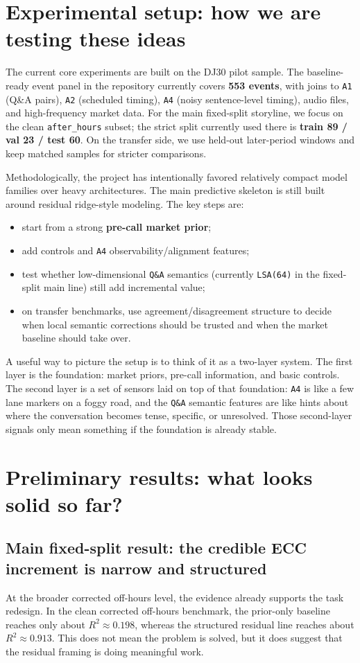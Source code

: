 \documentclass[11pt]{article}
\begin{document}
\section{Experimental setup: how we are testing these ideas}
The current core experiments are built on the DJ30 pilot sample. The baseline-ready event panel in the repository currently covers \textbf{553 events}, with joins to \texttt{A1} (Q\&A pairs), \texttt{A2} (scheduled timing), \texttt{A4} (noisy sentence-level timing), audio files, and high-frequency market data. For the main fixed-split storyline, we focus on the clean \texttt{after\_hours} subset; the strict split currently used there is \textbf{train 89 / val 23 / test 60}. On the transfer side, we use held-out later-period windows and keep matched samples for stricter comparisons.

Methodologically, the project has intentionally favored relatively compact model families over heavy architectures. The main predictive skeleton is still built around residual ridge-style modeling. The key steps are:
\begin{itemize}
    \item start from a strong \textbf{pre-call market prior};
    \item add controls and \texttt{A4} observability/alignment features;
    \item test whether low-dimensional \texttt{Q\&A} semantics (currently \texttt{LSA(64)} in the fixed-split main line) still add incremental value;
    \item on transfer benchmarks, use agreement/disagreement structure to decide when local semantic corrections should be trusted and when the market baseline should take over.
\end{itemize}

A useful way to picture the setup is to think of it as a two-layer system. The first layer is the foundation: market priors, pre-call information, and basic controls. The second layer is a set of sensors laid on top of that foundation: \texttt{A4} is like a few lane markers on a foggy road, and the \texttt{Q\&A} semantic features are like hints about where the conversation becomes tense, specific, or unresolved. Those second-layer signals only mean something if the foundation is already stable.

\section{Preliminary results: what looks solid so far?}
\subsection{Main fixed-split result: the credible ECC increment is narrow and structured}
At the broader corrected off-hours level, the evidence already supports the task redesign. In the clean corrected off-hours benchmark, the prior-only baseline reaches only about \textbf{$R^2 \approx 0.198$}, whereas the structured residual line reaches about \textbf{$R^2 \approx 0.913$}. This does not mean the problem is solved, but it does suggest that the residual framing is doing meaningful work.
\end{document}
